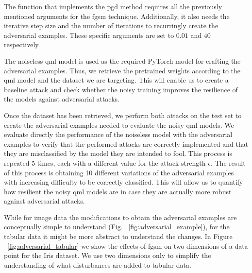 The function that implements the \ac{pgd} method
requires all the previously mentioned arguments
for the \ac{fgsm} technique. Additionally, it
also needs the iterative step size and the
number of iterations to recurringly create the
adversarial examples. These specific arguments are
set to \(0.01\)  and \(40\) respectively. \

The noiseless \ac{qml} model is used as the required
PyTorch model for crafting the adversarial examples.
Thus, we retrieve the pretrained weights according to the
\ac{qml} model and the dataset we are targeting.
This will enable us to create a baseline attack
and check whether the noisy training improves
the resilience of the models against adversarial
attacks. \

Once the dataset has been retrieved, we perform
both attacks on the test set to create the adversarial
examples needed to evaluate the noisy \ac{qml} models.
We evaluate directly the performance of the noiseless
model with the adversarial examples to verify that
the performed attacks are correctly implemented and
that they are misclassified by the model they are
intended to fool. This process is repeated 5 times,
each with a different value for the attack strength
\(\epsilon\). The result of this process is obtaining
10 different variations of the adversarial examples with
increasing difficulty to be correctly classified. This will
allow us to quantify how resilient the noisy \ac{qml}
models are in case they are actually more robust
against adversarial attacks. \

While for image data the modifications to obtain the adversarial
examples are conceptually simple to understand (Fig.
~\ref{fig:adversarial_example}), for the tabular data it
might be more abstract to understand the changes. In Figure
~\ref{fig:adversarial_tabular} we show the effects of \ac{fgsm}
on two dimensions of a data point for the Iris dataset. We use
two dimensions only to simplify the understanding of what
disturbances are added to tabular data. \

